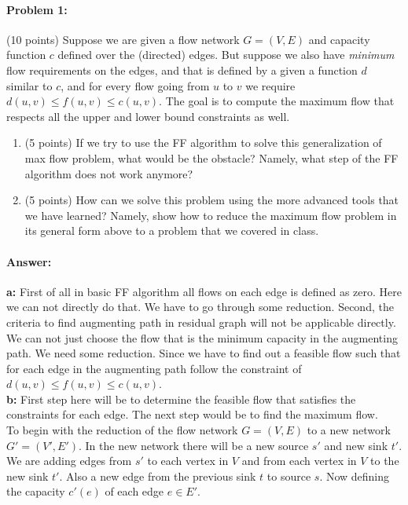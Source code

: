 \paragraph{Problem 1:} (10 points) Suppose we are given a flow network $G=(V,E)$ and capacity function $c$ defined over the (directed) edges. But suppose we also have \emph{minimum} flow requirements on the edges, and that is defined by a given a function $d$ similar to $c$, and for every flow going from $u$ to $v$ we require $d(u,v) \leq f(u,v) \leq c(u,v)$. The goal is to compute the maximum flow that respects all the upper and lower bound constraints as well.

\begin{enumerate}[label=\alph*]
\item (5 points) If we try to use the FF algorithm to solve this generalization of max flow problem, what would be the obstacle? Namely, what step of the FF algorithm does not work anymore?



\item (5 points) How can we solve this problem  using the more advanced tools that we have learned? Namely, show how to reduce the maximum flow problem in its general form above to a problem that we covered in class.
\end{enumerate}
\paragraph{Answer:}

\textbf{a:} First of all in basic FF algorithm all flows on each edge is defined as zero. Here we can not directly do that. We have to go through some reduction. Second, the criteria to find augmenting path in residual graph will not be applicable directly. We can not just choose the flow that is the minimum capacity in the augmenting path. We need some reduction. Since we have to find out a feasible flow such that for each edge in the augmenting path follow the constraint of $d(u,v) \leq f(u,v) \leq c(u,v)$.\\
\textbf{b:}
First step here will be to determine the feasible flow that satisfies the constraints for each edge. The next step would be to find the maximum flow. \\
To begin with the reduction of the flow network $G=(V,E)$ to a new network $G'=(V',E')$. In the new network there will be a new source $s'$ and new sink $t'$. We are adding edges from $s'$ to each vertex in $V$ and from each vertex in $V$ to the new sink $t'$. Also a new edge from the previous sink $t$ to source $s$. Now defining the capacity $c'(e)$ of each edge $e \in E'$. 

